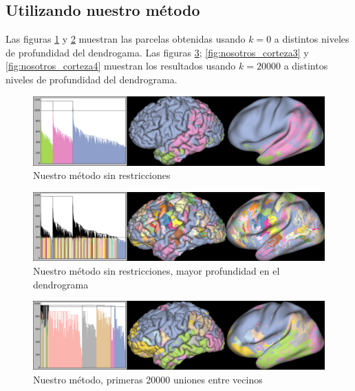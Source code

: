 \clearpage

\subsection{Utilizando nuestro m\'etodo}

Las figuras \ref{fig:nosotros_corteza0} y \ref{fig:nosotros_corteza1} muestran 
las parcelas obtenidas usando $k=0$ a distintos niveles de profundidad del dendrogama.
Las figuras \ref{fig:nosotros_corteza2}; \ref{fig:nosotros_corteza3} y
\ref{fig:nosotros_corteza4} muestran los resultados usando $k=20000$  a distintos
niveles de profundidad del dendrograma.

\begin{figure}[h!]
    \includegraphics[width=\textwidth]{img/all_brain/logit_0.png}
    \caption{Nuestro m\'etodo sin restricciones}
    \label{fig:nosotros_corteza0}
\end{figure}
                                                                                                                        
\begin{figure}[h!]
    \includegraphics[width=\textwidth]{img/all_brain/logit_0_deep.png}
    \caption{Nuestro m\'etodo sin restricciones, mayor profundidad en el 
            dendrograma}
    \label{fig:nosotros_corteza1}
\end{figure}

\begin{figure}[h!]
    \includegraphics[width=\textwidth]{img/all_brain/logit_20000.png}
    \caption{Nuestro m\'etodo, primeras 20000 uniones entre vecinos}
    \label{fig:nosotros_corteza2}
\end{figure}

